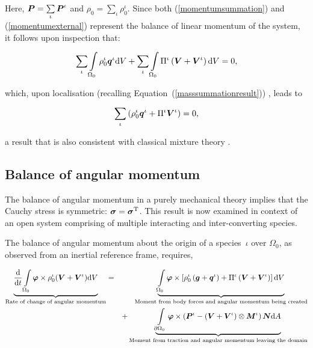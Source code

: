 \noindent Here, $\mbox{\boldmath$ P$} = \sum\limits_{\iota}\mbox{\boldmath$ P$}^\iota$ and $\rho_0 =
\sum\limits_{\iota}\rho_0^\iota$. Since both (\ref{momentumsummation})
and (\ref{momentumexternal}) represent the balance of linear momentum
of the system, it follows upon inspection that:

\begin{eqnarray}
\sum\limits_{\iota}\int\limits_{\Omega_0} \rho^\iota_0\mbox{\boldmath$ q$}^\iota
\mathrm{d}V + \sum\limits_{\iota}\int\limits_{\Omega_0} \Pi^\iota
\left(\mbox{\boldmath$ V$}+\mbox{\boldmath$ V$}^\iota\right) \mathrm{d}V = 0,\nonumber
\end{eqnarray}

\noindent which, upon localisation (recalling
Equation~(\ref{masssummationresult})) , leads to

\begin{eqnarray}
\sum\limits_{\iota}\left(\rho^\iota_0\mbox{\boldmath$ q$}^\iota +
\Pi^\iota\mbox{\boldmath$ V$}^\iota\right)=0,
\label{momentumsummationresult}
\end{eqnarray}

\noindent a result that is also consistent with classical mixture
theory \citep{TruesdellNoll:65}.

\subsection{Balance of angular momentum}
\label{balance-of-angular-momentum}

The balance of angular momentum in a purely mechanical theory implies
that the Cauchy stress is symmetric: $\mbox{\boldmath$\sigma$} =
\mbox{\boldmath$\sigma$}^{\mathrm{T}}$. This result is now examined in context of an
open system comprising of multiple interacting and inter-converting
species.

The balance of angular momentum about the origin of a species~$\iota$
over $\Omega_{0}$, as observed from an inertial reference frame,
requires,

\begin{eqnarray}
\underbrace{\frac{\mathrm{d}}{\mathrm{d}t} \int\limits_{\Omega_0}
  \mbox{\boldmath$\varphi$} \times \rho^\iota_0(\mbox{\boldmath$ V$}+\mbox{\boldmath$ V$}^\iota)\mathrm{d}V}_{\text{Rate
    of change of angular momentum}} &=&
\underbrace{\int\limits_{\Omega_0}\mbox{\boldmath$\varphi$}\times\left
  [\rho^\iota_0\left(\mbox{\boldmath$ g$}+\mbox{\boldmath$ q$}^\iota\right) +
    \Pi^\iota\left(\mbox{\boldmath$ V$}+\mbox{\boldmath$ V$}^\iota\right)\right]\mathrm{d}V}_{\text{Moment
    from body forces and angular momentum being created}}
\nonumber\\ & &+ \underbrace{
  \int\limits_{\partial\Omega_0}\mbox{\boldmath$\varphi$}\times\left(\mbox{\boldmath$ P$}^\iota -
  \left(\mbox{\boldmath$ V$}+\mbox{\boldmath$ V$}^\iota\right)\otimes\mbox{\boldmath$ M$}^\iota\right)\mbox{\boldmath$ N$}
  \mathrm{d}A}_{\text{Moment from traction and angular momentum
    leaving the domain}}
\label{globalbalanceofangularmomentum}
\end{eqnarray}

